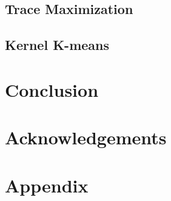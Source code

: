 \subsection{Trace Maximization}
\label{sec:trmax}

\subsection{Kernel K-means}
\label{sec:kkmean}

\section{Conclusion}
\label{sec:conclusion}


\section*{Acknowledgements}




\section*{Appendix}



